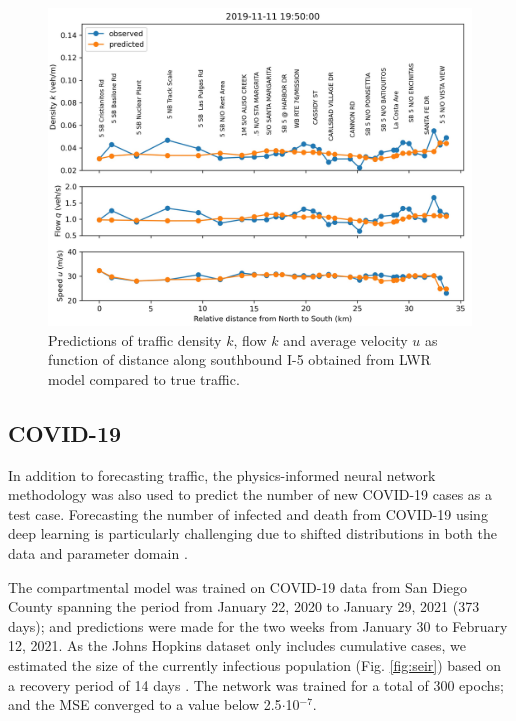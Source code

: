 \documentclass{article}
\begin{document}
\begin{figure}[hbt!]
    \centering
    \includegraphics[width=\textwidth]{images/LWR_prediction_5S.jpg}
    \caption{Predictions of traffic density $k$, flow $k$ and average velocity $u$ as function of distance along southbound I-5 obtained from LWR model compared to true traffic.}
    \label{fig:lwr}
\end{figure}

\subsection{COVID-19}

In addition to forecasting traffic, the physics-informed neural network methodology was also used to predict the number of new COVID-19 cases as a test case. Forecasting the number of infected and death from COVID-19 using deep learning is particularly challenging due to shifted distributions in both the data and parameter domain \cite{wang2020bridging}.

The compartmental model was trained on COVID-19 data from San Diego County spanning the period from January 22, 2020 to January 29, 2021 (373 days); and predictions were made for the two weeks from January 30 to February 12, 2021.  As the Johns Hopkins dataset only includes cumulative cases, we estimated the size of the currently infectious population (Fig. \ref{fig:seir}) based on a recovery period of 14 days \cite{lange2021covid}.  The network was trained for a total of 300 epochs; and the MSE converged to a value below 2.5$\cdot$10$^{-7}$.
\end{document}
